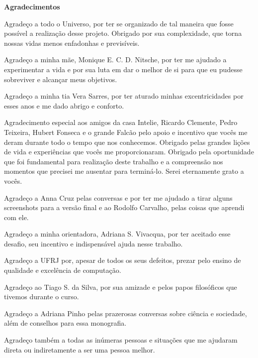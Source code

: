 \begin{titlepage}
\begin{center}
  \Large
  \textbf{Agradecimentos}
\end{center}

Agradeço a todo o Universo, por ter se organizado de tal maneira que fosse possível a realização desse projeto. Obrigado por sua complexidade, que torna nossas vidas menos enfadonhas e previsíveis.

Agradeço a minha mãe, Monique E. C. D. Nitsche, por ter me ajudado a experimentar a vida e por sua luta em dar o melhor de si para que eu pudesse sobreviver e alcançar meus objetivos.

Agradeço a minha tia Vera Sarres, por ter aturado minhas excentricidades por esses anos e me dado abrigo e conforto.

Agradecimento especial aos amigos da casa Intelie, Ricardo Clemente, Pedro Teixeira, Hubert Fonseca e o grande Falcão pelo apoio e incentivo que vocês me deram durante todo o tempo que nos conhecemos. Obrigado pelas grandes lições de vida e experiências que vocês me proporcionaram. Obrigado pela oportunidade que foi fundamental para realização deste trabalho e a compreensão nos momentos que precisei me ausentar para terminá-lo. Serei eternamente grato a vocês.

Agradeço a Anna Cruz pelas conversas e por ter me ajudado a tirar alguns screenshots para a versão final e ao Rodolfo Carvalho, pelas coisas que aprendi com ele.

Agradeço a minha orientadora, Adriana S. Vivacqua, por ter aceitado esse desafio, seu incentivo e indispensável ajuda nesse trabalho.

Agradeço a UFRJ por, apesar de todos os seus defeitos, prezar pelo ensino de qualidade e excelência de computação.

Agradeço ao Tiago S. da Silva, por sua amizade e pelos papos filosóficos que tivemos durante o curso.

Agradeço a Adriana Pinho pelas prazerosas conversas sobre ciência e sociedade, além de conselhos para essa monografia.

Agradeço também a todas as inúmeras pessoas e situações que me ajudaram direta ou indiretamente a ser uma pessoa melhor.


\end{titlepage}
